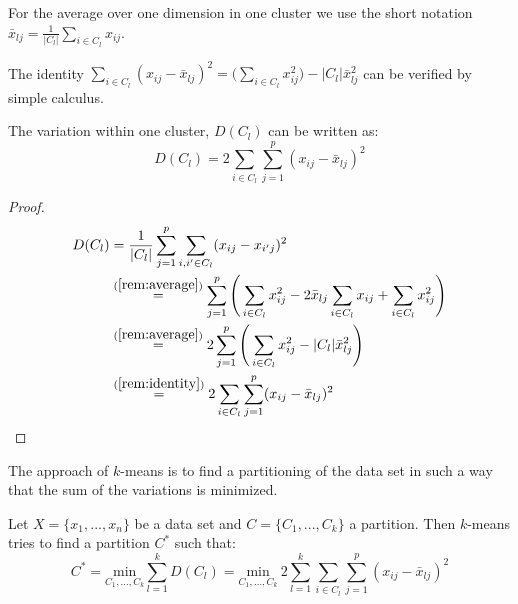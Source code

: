 \begin{remark} \label{rem:average}
	For the average over one dimension in one cluster we use the short notation
	$\bar x_{lj} = \frac{1}{|C_l|} \sum_{i \in C_l} x_{ij}$.
\end{remark}

\begin{remark} \label{rem:identity}
 	The identity $\sum_{i \in C_l}(x_{ij}-\bar x_{lj})^2 = \big( \sum_{i \in C_l} x_{ij}^2 \big) - |C_l| \bar x_{lj}^2$ can be verified by simple calculus. 
\end{remark}

\begin{corollary}\label{equ:Steiner}
The variation within one cluster, $D(C_l)$ can be written as: 
	\begin{equation}
		D(C_l) =2 \sum_{i \in C_l} \sum_{j=1}^p (x_{ij}-\bar x_{lj})^2
	\end{equation}
\end{corollary}
\begin{proof}
	\begin{equation*} \label{equ:Steiner}
	\begin{split} %
		D(C_l)	&= \frac{1}{|C_l|}\sum_{j=1}^p \sum_{i,i' \in C_l} (x_{ij} - x_{i'j})^2 \\
				& \overset{(\ref{rem:average})}{=} \sum_{j=1}^p \Bigg( \sum_{i \in C_l} x_{ij}^2 - 2 \bar x_{lj} \sum_{i \in C_l} x_{ij} + \sum_{i \in C_l} x_{ij}^2 \Bigg) \\
				& \overset{(\ref{rem:average})}{=}2 \sum_{j=1}^p \Bigg( \sum_{i \in C_l} x_{ij}^2 - |C_l| \bar x_{lj}^2 \Bigg) \\
				& \overset{(\ref{rem:identity})}{=} 2 \sum_{i \in C_l} \sum_{j=1}^p (x_{ij}-\bar x_{lj})^2
	\end{split}
	\end{equation*}
\end{proof}

The approach of $k$-means is to find a partitioning of the data set in such a way that the sum of the variations is minimized.

\begin{definition}[$k$-means]
Let $X = \{x_1, ..., x_n\}$ be a data set and $C=\{C_1, ..., C_k\}$ a partition. Then $k$-means tries to find a partition $C^*$ such that: 
	\begin{equation}\label{equ:K-means}
		C^* = \underset{C_1, \dots, C_k}{\text{min}} \sum_{l=1}^k D(C_l) = \underset{C_1, \dots, C_k}{\text{min}} ~2 \sum_{l=1}^k  \sum_{i \in C_l} \sum_{j=1}^p (x_{ij}- \bar x_{lj})^2
	\end{equation}
\end{definition}

